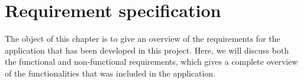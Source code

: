 \chapter{Requirement specification}
\label {sec:recSpecification}

The object of this chapter is to give an overview of the requirements for the application that has been developed in this project. Here, we will discuss both the functional and non-functional requirements, which gives a complete overview of the functionalities that was included in the application.



\newpage
